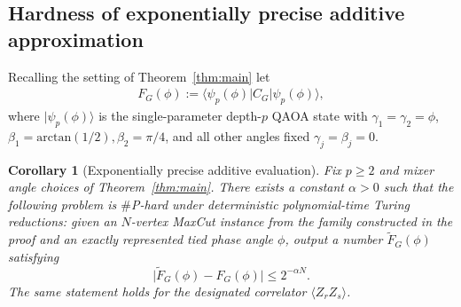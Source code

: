 \documentclass[11pt]{article}
\newtheorem{corollary}[theorem]{Corollary}
\begin{document}
\subsection{Hardness of exponentially precise additive approximation} \label{sec:expoApprox}
Recalling the setting of Theorem~\ref{thm:main} let 
\begin{eqnarray}
      F_G(\phi)
  :=
  \langle \psi_p(\phi) | C_G | \psi_p(\phi) \rangle,
\end{eqnarray}
where $|\psi_p(\phi)\rangle$ is the single-parameter depth-$p$ QAOA state with $\gamma_1=\gamma_2=\phi$, $\beta_1=\textrm{arctan}(1/2), \beta_2=\pi/4$, and all other angles fixed $\gamma_j=\beta_j=0$.


\begin{corollary}[Exponentially precise additive evaluation]\label{cor:precision}
Fix \(p\ge2\) and %
mixer angle choices of 
Theorem~\ref{thm:main}.  There exists a constant \(\alpha>0\) such that
the following problem is $\#$P-hard under deterministic
polynomial-time Turing reductions: given an \(N\)-vertex MaxCut
instance from the family constructed in the proof and an exactly
represented tied phase angle \(\phi\), output a number
\(\widetilde F_G(\phi)\) satisfying
\[
   \bigl|\widetilde F_G(\phi)-F_G(\phi)\bigr|
   \le 2^{-\alpha N}.
\]
The same statement holds for the designated correlator
\(\langle Z_rZ_s\rangle\).
\end{corollary}
\end{document}
